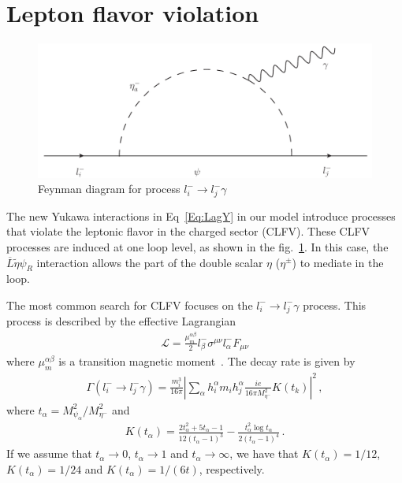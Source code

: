 \documentclass[12pt]{article}
\begin{document}
\section{Lepton flavor violation}
\label{sec:LFV}
%
\begin{figure}
\centering
\includegraphics[scale=0.6]{LFV.pdf}
\caption{Feynman diagram for process $l^{-}_{i} \to l^{-}_{j} \gamma$}
\label{fig:LFV}
\end{figure}
%
The new Yukawa interactions in Eq~\eqref{Eq:LagY} in our model introduce processes that violate the leptonic flavor in the charged sector (CLFV). These CLFV processes are induced at one loop level, as shown in the fig.~\ref{fig:LFV}. In this case, the $\overline{L} \tilde{\eta} \psi_R$ interaction allows the part of the double scalar $\eta$ ($\eta^{\pm}$) to mediate in the loop.

The most common search for CLFV focuses on the $l^{-}_{i} \to l^{-}_{j} \gamma$ process. This process is described by the effective Lagrangian
%
\begin{align}
    \mathcal{L} = \frac{\mu_{m}^{\alpha \beta}}{2} l^{-}_{\beta} \sigma^{\mu \nu} l^{-}_{\alpha} F_{\mu \nu}
\end{align}
%
where $\mu_{m}^{\alpha \beta}$ is a transition magnetic moment~\cite{Toma:2013zsa}.
The decay rate is given by~\cite{Lavoura:2003xp}
%
\begin{align}
 \Gamma(l^{-}_{i} \to l^{-}_{j} \gamma) = \frac{m^{3}_{i}}{16 \pi} \left| \sum_{\alpha} h^{\alpha}_{i} m_{i} h^{\alpha}_{j} \frac{i e}{16 \pi M^{2}_{\eta^{-}}} K(t_{k}) \right|^{2}\,, 
\end{align}
%
where $t_{\alpha} = M^{2}_{\psi_{\alpha}}/M^{2}_{\eta^{-}}$ and
%
\begin{align}
    K(t_{\alpha}) = \frac{2t_{\alpha}^{2}+5t_{\alpha}-1}{12(t_{\alpha}-1)^{3}} - \frac{t_{\alpha}^{2}\log t_{\alpha}}{2(t_{\alpha}-1)^{4}}\,.
\end{align}
%
If we assume that $t_{\alpha} \to 0$, $t_{\alpha} \to 1$ and $t_{\alpha} \to \infty$, we have that $K(t_{\alpha}) = 1/12$, $K(t_{\alpha}) = 1/24$ and $K(t_{\alpha}) = 1/(6t)$, respectively.
\end{document}
